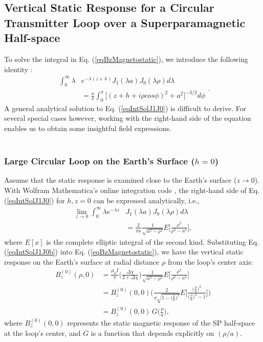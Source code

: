 \documentclass[onecolumn]{IEEEtran} %
\begin{document}
\subsection{Vertical Static Response for a Circular Transmitter Loop over a Superparamagnetic Half-space} \label{secVertical} To solve the integral in Eq. (\ref{eqBzMagnetostatic}), we introduce the following identity \cite{Erdelyi1954}:
\begin{equation}
\begin{split}
\int^{\infty}_0 \lambda &e^{-\lambda (z+h)} J_1(\lambda a) J_0 (\lambda \rho) d \lambda \\
&= \frac{a}{\pi} \int_0^\pi \big [ (z +h + i\rho cos\phi )^2 + a^2 \big ]^{-3/2} d\phi
\end{split}.
\label{eqIntSolJ1J0}
\end{equation}
A general analytical solution to Eq. (\ref{eqIntSolJ1J0}) is difficult to derive. For several special cases however, working with the right-hand side of the equation enables us to obtain some insightful field expressions.
\\\\
\subsubsection{Large Circular Loop on the Earth's Surface ($h=0$)} Assume that the static response is examined close to the Earth's surface ($z \rightarrow 0$). With Wolfram Mathematica's online integration code \cite{Wolfram2016}, the right-hand side of Eq. (\ref{eqIntSolJ1J0}) for $h,z = 0$ can be expressed analytically, i.e.,
\begin{align}
\lim_{z \rightarrow 0} \int^{\infty}_0 \lambda e^{-\lambda z} &J_1(\lambda a) J_0 (\lambda \rho) d \lambda \nonumber \\
\label{eqIntSolJ1J0b} &= \frac{2 }{\pi a} \frac{1}{\sqrt{a^2-\rho^2}} E \Bigg [ \frac{\rho^2}{\rho^2 - a^2} \Bigg ],
\end{align}
where $E[x]$ is the complete elliptic integral of the second kind. Substituting Eq. (\ref{eqIntSolJ1J0b}) into Eq. (\ref{eqBzMagnetostatic}), we have the vertical static response on the Earth's surface at radial distance $\rho$ from the loop's center axis:
\begin{equation}
\begin{split}
B^{(0)}_z(\rho,0) &= \frac{\mu_0 I}{\pi} \Bigg ( \frac{\Delta \chi}{2+\Delta \chi} \Bigg ) \frac{1}{\sqrt{a^2 -\rho^2}} E \Bigg [ \frac{ \rho^2}{\rho^2 - a^2} \Bigg ] \\
&= B^{(0)}_z(0,0) \Bigg ( \frac{2 }{\pi \sqrt{1 -\big ( \frac{\rho}{a} \big )^2}} E \Bigg [ \frac{ \big (\frac{\rho}{a} \big )^2}{\big (\frac{\rho}{a} \big )^2 - 1} \Bigg ] \Bigg ) \\
&= B_z^{(0)}(0,0) \, G \Big (\frac{\rho}{a} \Big ),
\end{split}
\label{eqIntSolJ1J0a3}
\end{equation}
where $B^{(0)}_z (0, 0)$  represents the static magnetic response of the SP half-space at the loop's center, and $G$ is a function that depends explicitly on $(\rho /a)$.
\\
\end{document}
